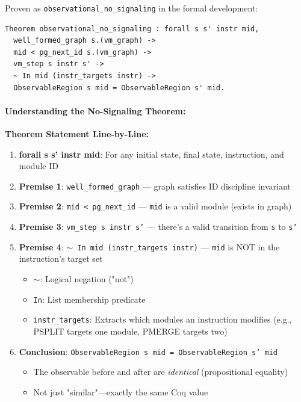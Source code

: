 Proven as \texttt{observational\_no\_signaling} in the formal development:
\begin{lstlisting}
Theorem observational_no_signaling : forall s s' instr mid,
  well_formed_graph s.(vm_graph) ->
  mid < pg_next_id s.(vm_graph) ->
  vm_step s instr s' ->
  ~ In mid (instr_targets instr) ->
  ObservableRegion s mid = ObservableRegion s' mid.
\end{lstlisting}

\paragraph{Understanding the No-Signaling Theorem:}
\textbf{Theorem Statement Line-by-Line:}
\begin{enumerate}
    \item \textbf{forall s s' instr mid}: For any initial state, final state, instruction, and module ID
    \item \textbf{Premise 1}: \texttt{well\_formed\_graph} — graph satisfies ID discipline invariant
    \item \textbf{Premise 2}: \texttt{mid < pg\_next\_id} — \texttt{mid} is a valid module (exists in graph)
    \item \textbf{Premise 3}: \texttt{vm\_step s instr s'} — there's a valid transition from \texttt{s} to \texttt{s'}
    \item \textbf{Premise 4}: \texttt{$\sim$ In mid (instr\_targets instr)} — \texttt{mid} is NOT in the instruction's target set
    \begin{itemize}
        \item \texttt{$\sim$}: Logical negation ("not")
        \item \texttt{In}: List membership predicate
        \item \texttt{instr\_targets}: Extracts which modules an instruction modifies (e.g., PSPLIT targets one module, PMERGE targets two)
    \end{itemize}
    \item \textbf{Conclusion}: \texttt{ObservableRegion s mid = ObservableRegion s' mid}
    \begin{itemize}
        \item The observable before and after are \emph{identical} (propositional equality)
        \item Not just "similar"—exactly the same Coq value
    \end{itemize}
\end{enumerate}

